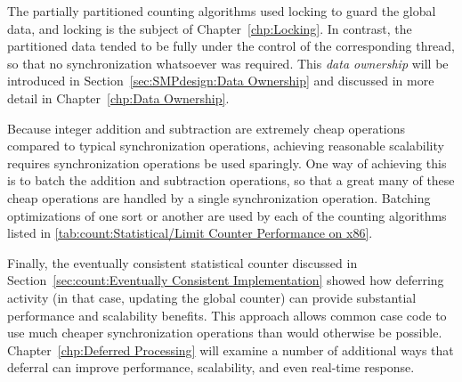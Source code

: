 \QuickQuizEnd

The partially partitioned counting algorithms used locking to
guard the global data, and locking is the subject of
Chapter~\ref{chp:Locking}.
In contrast, the partitioned data tended to be fully under the control of
the corresponding thread, so that no synchronization whatsoever was required.
This \emph{data ownership} will be introduced in
Section~\ref{sec:SMPdesign:Data Ownership}
and discussed in more detail in
Chapter~\ref{chp:Data Ownership}.

Because integer addition and subtraction are extremely cheap operations
compared to typical synchronization operations, achieving reasonable
scalability requires synchronization operations be used sparingly.
One way of achieving this is to batch the addition and subtraction
operations, so that a great many of these cheap operations are handled
by a single synchronization operation.
Batching optimizations of one sort or another are used by each of
the counting algorithms listed in
\cref{tab:count:Statistical/Limit Counter Performance on x86}.

Finally, the eventually consistent statistical counter discussed in
Section~\ref{sec:count:Eventually Consistent Implementation}
showed how deferring activity (in that case, updating the global
counter) can provide substantial performance and scalability benefits.
This approach allows common case code to use much cheaper synchronization
operations than would otherwise be possible.
Chapter~\ref{chp:Deferred Processing} will examine a number of additional
ways that deferral can improve performance, scalability, and even
real-time response.

